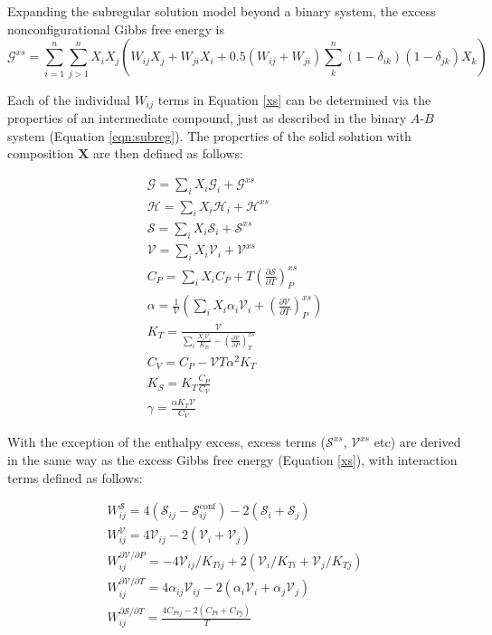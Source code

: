 Expanding the subregular solution model beyond a binary system, the excess nonconfigurational Gibbs free energy is \citep{HW1989} 
\begin{equation}
  \mathcal{G}^{xs} = \sum_{i=1}^n \sum_{j>1}^n X_i X_j \left ( W_{ij} X_j + W_{ji} X_i + 0.5 (W_{ij} + W_{ji}) \sum_k^n (1-\delta_{ik})(1-\delta_{jk}) X_k \right)
  \label{xs}
\end{equation}

Each of the individual $W_{ij}$ terms in Equation \ref{xs} can be determined via the properties of an intermediate compound, just as described in the binary $A$-$B$ system (Equation \ref{eqn:subreg}). The properties of the solid solution with composition $\mathbf{X}$ are then defined as follows:

\begin{eqnarray}
\mathcal{G} = \sum_i X_i \mathcal{G}_i + \mathcal{G}^{xs} \\
\mathcal{H} = \sum_i X_i \mathcal{H}_i + \mathcal{H}^{xs} \\
\mathcal{S} = \sum_i X_i \mathcal{S}_i + \mathcal{S}^{xs} \\
\mathcal{V} = \sum_i X_i \mathcal{V}_i + \mathcal{V}^{xs} \\
C_P = \sum_i X_i C_P  + T \left( \frac{\partial \mathcal{S}}{\partial T} \right)_P^{xs} \\
\alpha = \frac{1}{\mathcal{V}} \left ( \sum_i X_i \alpha_i \mathcal{V}_i + \left( \frac{\partial \mathcal{V}}{\partial T} \right)_P^{xs} \right) \label{alpha} \\
K_T = \frac{\mathcal{V}}{\sum_i \frac{X_i \mathcal{V}_i }{K_{Ti}} - \left( \frac{\partial \mathcal{V}}{\partial P} \right)_T^{xs} } \label{K_T} \\
C_V = C_P - \mathcal{V} T \alpha^2 K_T \\
K_S = K_T \frac{C_P}{C_V} \\
\gamma = \frac{\alpha K_T \mathcal{V}}{C_V}   
\end{eqnarray}

With the exception of the enthalpy excess, excess terms ($\mathcal{S}^{xs}$, $\mathcal{V}^{xs}$ etc) are derived in the same way as the excess Gibbs free energy (Equation \ref{xs}), with interaction terms defined as follows:

\begin{eqnarray}
  W^{\mathcal{S}}_{ij} = 4 (\mathcal{S}_{ij} - \mathcal{S}^{\textrm{conf}}_{ij}) - 2(\mathcal{S}_i + \mathcal{S}_j) \\
  W^{\mathcal{V}}_{ij} = 4 \mathcal{V}_{ij} - 2(\mathcal{V}_i + \mathcal{V}_j) \\
  W^{\partial\mathcal{V}/\partial P}_{ij} = -4 \mathcal{V}_{ij}/K_{T{ij}} + 2(\mathcal{V}_{i}/K_{T{i}} + \mathcal{V}_{j}/K_{T{j}}) \\
  W^{\partial\mathcal{V}/\partial T}_{ij} = 4 \alpha_{ij} \mathcal{V}_{ij} - 2(\alpha_{i} \mathcal{V}_i + \alpha_{j} \mathcal{V}_j) \\
  W^{\partial\mathcal{S}/\partial T}_{ij} = \frac{4 C_{P{ij}} - 2(C_{P{i}} + C_{P{j}})}{T} 
\end{eqnarray}

